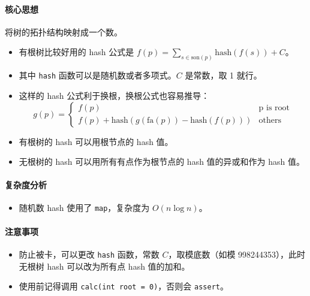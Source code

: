 \paragraph{核心思想}
将树的拓扑结构映射成一个数。

\begin{itemize}
    \item 有根树比较好用的 hash 公式是 $f(p) = \sum_{s \in \text{son}(p)} \text{hash}(f(s)) + C$。
    \item 其中 \texttt{hash} 函数可以是随机数或者多项式。$C$ 是常数，取 1 就行。
    \item 这样的 hash 公式利于换根，换根公式也容易推导：
    \[
    g(p) = 
    \begin{cases} 
        f(p) & \text{p is root} \\ 
        f(p) + \text{hash}(g(\text{fa}(p)) - \text{hash}(f(p))) & \text{others} 
    \end{cases}
    \]
    \item 有根树的 hash 可以用根节点的 hash 值。
    \item 无根树的 hash 可以用所有有点作为根节点的 hash 值的异或和作为 hash 值。
\end{itemize}

\paragraph{复杂度分析}
\begin{itemize}[leftmargin=*]
    \item 随机数 hash 使用了 \texttt{map}，复杂度为 $O(n \log n)$。
\end{itemize}

\paragraph{注意事项}
\begin{itemize}[leftmargin=*]
    \item 防止被卡，可以更改 \texttt{hash} 函数，常数 $C$，取模底数（如模 998244353），此时无根树 hash 可以改为所有点 hash 值的加和。
    \item 使用前记得调用 \texttt{calc(int root = 0)}，否则会 \texttt{assert}。
\end{itemize}
